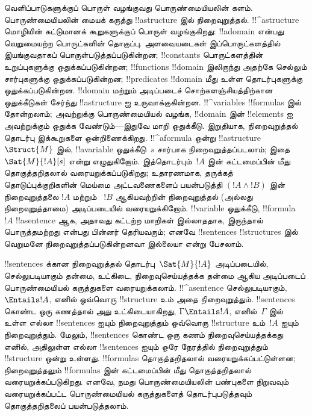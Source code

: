 \documentclass[../../../include/open-logic-section]{subfiles}
\begin{document}


வெளிப்பாடுகளுக்குப் பொருள் வழங்குவது பொருண்மையியலின் களம். பொருண்மையியலின்
மையக் கருத்து !!a{structure} இல் நிறைவுறுத்தல். !!^a{structure} மொழியின்
கட்டுமானக் கூறுகளுக்குப் பொருள் வழங்குகிறது: !!a{domain} என்பது வெறுமையற்ற
பொருட்களின் தொகுப்பு. அளவையடைகள் இப்பொருட்களத்தில் இயங்குவதாகப்
பொருள்படுத்தப்படுகின்றன; !!{constant}s பொருட்களத்தின் உறுப்புகளுக்கு
ஒதுக்கப்படுகின்றன; !!{function}s !!{domain} இலிருந்து அதற்கே செல்லும்
சார்புகளுக்கு ஒதுக்கப்படுகின்றன; !!{predicate}s !!{domain} மீது உள்ள
தொடர்புகளுக்கு ஒதுக்கப்படுகின்றன. !!{domain} மற்றும் அடிப்படைச்
சொற்களஞ்சியத்திற்கான ஒதுக்கீடுகள் சேர்ந்து !!a{structure} ஐ உருவாக்குகின்றன.
!!^{variable}s !!{formula}s இல் தோன்றலாம்; அவற்றுக்கு பொருண்மையியல்
வழங்க, !!{domain} இன் !!{element}s ஐ அவற்றுக்கும் ஒதுக்க வேண்டும்---இதுவே
மாறி ஒதுக்கீடு. இறுதியாக, நிறைவுறுத்தல் தொடர்பு இக்கூறுகளை ஒன்றிணைக்கிறது.
!!^a{formula} ஒன்று !!a{structure}~$\Struct{M}$ இல்,
!!a{variable} ஒதுக்கீடு~$s$ சார்பாக நிறைவுறுத்தப்படலாம்; இதை
$\Sat{M}{!A}[s]$ என்று எழுதுகிறோம். இத்தொடர்பும்~$!A$ இன் கட்டமைப்பின்
மீது தொகுத்தறிதலால் வரையறுக்கப்படுகிறது; உதாரணமாக, தருக்கத் தொடுப்புக்குறிகளின்
மெய்மை அட்டவணைகளைப் பயன்படுத்தி $(!A \land !B)$ இன் நிறைவுறுத்தலை
$!A$ மற்றும் ~$!B$ ஆகியவற்றின் நிறைவுறுத்தல் (அல்லது நிறைவுறுத்தாமை) அடிப்படையில்
வரையறுக்கிறோம். !!{variable} ஒதுக்கீடு, !!{formula}~$!A$
!!a{sentence} ஆக, அதாவது கட்டற்ற மாறிகள் இல்லாததாக, இருந்தால் பொருத்தமற்றது
என்பது பின்னர் தெரியவரும்; எனவே !!{sentence}s !!{structure}s இல்
வெறுமனே நிறைவுறுத்தப்படுகின்றனவா இல்லையா என்று பேசலாம்.

!!{sentence}s க்கான நிறைவுறுத்தல் தொடர்பு~$\Sat{M}{!A}$ அடிப்படையில்,
செல்லுபடியாகும் தன்மை, உட்கிடை, நிறைவுசெய்யத்தக்க தன்மை ஆகிய அடிப்படைப்
பொருண்மையியல் கருத்துகளை வரையறுக்கலாம். !!^a{sentence} செல்லுபடியாகும்,
$\Entails !A$, எனில் ஒவ்வொரு !!{structure} உம் அதை நிறைவுறுத்தும்.
!!{sentence}s கொண்ட ஒரு கணத்தால் அது உட்கிடையாகிறது,
$\Gamma \Entails !A$, எனில்~$\Gamma$ இல் உள்ள எல்லா !!{sentence}s ஐயும்
நிறைவுறுத்தும் ஒவ்வொரு !!{structure} உம்~$!A$ ஐயும் நிறைவுறுத்தும்.
மேலும், !!{sentence}s கொண்ட ஒரு கணம் நிறைவுசெய்யத்தக்கது எனில், அதிலுள்ள
எல்லா !!{sentence}s ஐயும் ஒரே நேரத்தில் நிறைவுறுத்தும் !!{structure} ஒன்று
உள்ளது. !!{formula}s தொகுத்தறிதலால் வரையறுக்கப்பட்டுள்ளன; நிறைவுறுத்தலும்
!!{formula}s இன் கட்டமைப்பின் மீது தொகுத்தறிதலால் வரையறுக்கப்படுகிறது.
எனவே, நமது பொருண்மையியலின் பண்புகளை நிறுவவும் வரையறுக்கப்பட்ட
பொருண்மையியல் கருத்துகளைத் தொடர்புபடுத்தவும் தொகுத்தறிதலைப் பயன்படுத்தலாம்.
\end{document}
